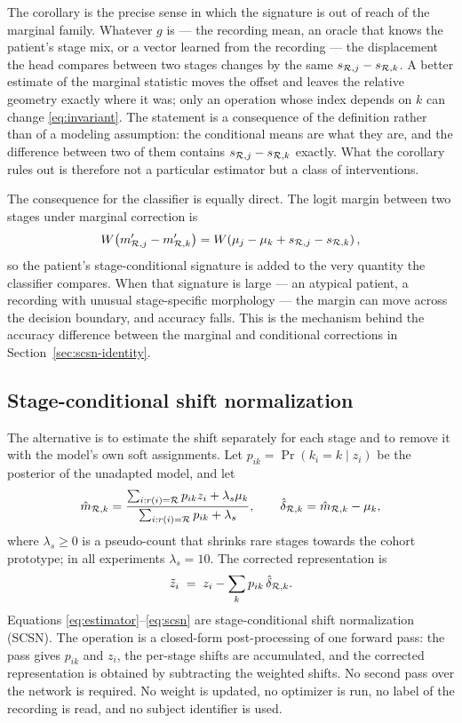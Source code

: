 The corollary is the precise sense in which the signature is out of reach of
the marginal family. Whatever $g$ is --- the recording mean, an oracle that
knows the patient's stage mix, or a vector learned from the recording --- the
displacement the head compares between two stages changes by the same
$s_{\mathcal{R},j}-s_{\mathcal{R},k}$. A better estimate of the marginal statistic moves the
offset and leaves the relative geometry exactly where it was; only an operation
whose index depends on $k$ can change \eqref{eq:invariant}. The statement is a
consequence of the definition rather than of a modeling assumption: the
conditional means are what they are, and the difference between two of them
contains $s_{\mathcal{R},j}-s_{\mathcal{R},k}$ exactly. What the corollary rules out is
therefore not a particular estimator but a class of interventions.

The consequence for the classifier is equally direct. The logit margin
between two stages under marginal correction is
\begin{equation}
  W\!\left(m'_{\mathcal{R},j}-m'_{\mathcal{R},k}\right)
  = W\!\left(\mu_j-\mu_k+s_{\mathcal{R},j}-s_{\mathcal{R},k}\right),
  \label{eq:marginal-margin}
\end{equation}
so the patient's stage-conditional signature is added to the very quantity
the classifier compares. When that signature is large --- an atypical patient,
a recording with unusual stage-specific morphology --- the margin can move
across the decision boundary, and accuracy falls. This is the mechanism behind
the accuracy difference between the marginal and conditional corrections in
Section~\ref{sec:scsn-identity}.

\subsection{Stage-conditional shift normalization}

The alternative is to estimate the shift separately for each stage and to
remove it with the model's own soft assignments. Let
$p_{ik}=\Pr(k_i=k\mid z_i)$ be the posterior of the unadapted model, and let
\begin{equation}
  \hat m_{\mathcal{R},k}
  =\frac{\sum_{i:r(i)=\mathcal{R}}p_{ik}z_i+\lambda_s\mu_k}
         {\sum_{i:r(i)=\mathcal{R}}p_{ik}+\lambda_s},
  \qquad
  \hat\delta_{\mathcal{R},k}=\hat m_{\mathcal{R},k}-\mu_k ,
  \label{eq:estimator}
\end{equation}
where $\lambda_s\ge0$ is a pseudo-count that shrinks rare stages towards the
cohort prototype; in all experiments $\lambda_s=10$. The corrected
representation is
\begin{equation}
  \tilde z_i \;=\; z_i-\sum_{k}p_{ik}\,\hat\delta_{\mathcal{R},k}.
  \label{eq:scsn}
\end{equation}
Equations \eqref{eq:estimator}--\eqref{eq:scsn} are stage-conditional shift
normalization (SCSN). The operation is a closed-form post-processing of one
forward pass: the pass gives $p_{ik}$ and $z_i$, the per-stage shifts are
accumulated, and the corrected representation is obtained by subtracting the
weighted shifts. No second pass over the network is required. No weight is
updated, no optimizer is run, no label of the recording is read, and no
subject identifier is used.

